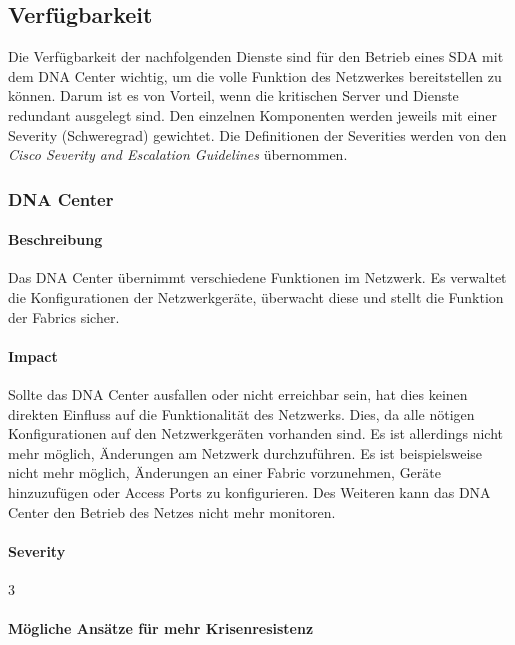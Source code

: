 \subsection{Verfügbarkeit}
Die Verfügbarkeit der nachfolgenden Dienste sind für den Betrieb eines SDA mit dem DNA Center wichtig, um die volle Funktion des Netzwerkes bereitstellen zu können. Darum ist es von Vorteil, wenn die kritischen Server und Dienste redundant ausgelegt sind. Den einzelnen Komponenten werden jeweils mit einer Severity (Schweregrad) gewichtet. Die Definitionen der Severities werden von den \textit{Cisco Severity and Escalation Guidelines} übernommen. \cite{cisco-severity-guidelines}

\subsubsection{DNA Center}

\paragraph{Beschreibung}

Das DNA Center übernimmt verschiedene Funktionen im Netzwerk. Es verwaltet die Konfigurationen der Netzwerkgeräte, überwacht diese und stellt die Funktion der Fabrics sicher. 

\paragraph{Impact}

Sollte das DNA Center ausfallen oder nicht erreichbar sein, hat dies keinen direkten Einfluss auf die Funktionalität des Netzwerks. Dies, da alle nötigen Konfigurationen auf den Netzwerkgeräten vorhanden sind. Es ist allerdings nicht mehr möglich, Änderungen am Netzwerk durchzuführen. Es ist beispielsweise nicht mehr möglich, Änderungen an einer Fabric vorzunehmen, Geräte hinzuzufügen oder Access Ports zu konfigurieren. Des Weiteren kann das DNA Center den Betrieb des Netzes nicht mehr monitoren.

\paragraph{Severity} 3

\paragraph{Mögliche Ansätze für mehr Krisenresistenz}

